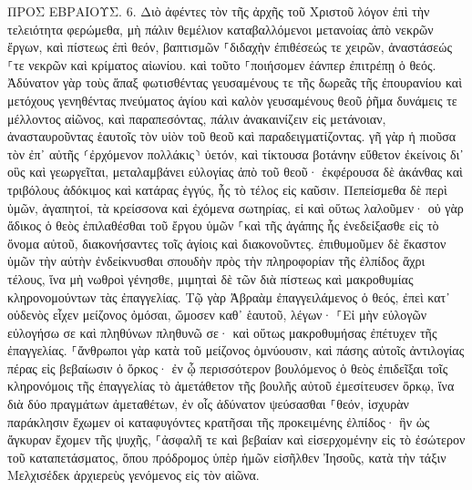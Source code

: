 \documentclass[twoside, 9pt]{extreport}
\begin{document}
ΠΡΟΣ ΕΒΡΑΙΟΥΣ.
6.
Διὸ ἀφέντες τὸν τῆς ἀρχῆς τοῦ Χριστοῦ λόγον ἐπὶ τὴν τελειότητα φερώμεθα, μὴ πάλιν θεμέλιον καταβαλλόμενοι μετανοίας ἀπὸ νεκρῶν ἔργων, καὶ πίστεως ἐπὶ θεόν, 
βαπτισμῶν ⸀διδαχὴν ἐπιθέσεώς τε χειρῶν, ἀναστάσεώς ⸀τε νεκρῶν καὶ κρίματος αἰωνίου. 
καὶ τοῦτο ⸀ποιήσομεν ἐάνπερ ἐπιτρέπῃ ὁ θεός. 
Ἀδύνατον γὰρ τοὺς ἅπαξ φωτισθέντας γευσαμένους τε τῆς δωρεᾶς τῆς ἐπουρανίου καὶ μετόχους γενηθέντας πνεύματος ἁγίου 
καὶ καλὸν γευσαμένους θεοῦ ῥῆμα δυνάμεις τε μέλλοντος αἰῶνος, 
καὶ παραπεσόντας, πάλιν ἀνακαινίζειν εἰς μετάνοιαν, ἀνασταυροῦντας ἑαυτοῖς τὸν υἱὸν τοῦ θεοῦ καὶ παραδειγματίζοντας. 
γῆ γὰρ ἡ πιοῦσα τὸν ἐπ᾽ αὐτῆς ⸂ἐρχόμενον πολλάκις⸃ ὑετόν, καὶ τίκτουσα βοτάνην εὔθετον ἐκείνοις δι᾽ οὓς καὶ γεωργεῖται, μεταλαμβάνει εὐλογίας ἀπὸ τοῦ θεοῦ· 
ἐκφέρουσα δὲ ἀκάνθας καὶ τριβόλους ἀδόκιμος καὶ κατάρας ἐγγύς, ἧς τὸ τέλος εἰς καῦσιν. 
Πεπείσμεθα δὲ περὶ ὑμῶν, ἀγαπητοί, τὰ κρείσσονα καὶ ἐχόμενα σωτηρίας, εἰ καὶ οὕτως λαλοῦμεν· 
οὐ γὰρ ἄδικος ὁ θεὸς ἐπιλαθέσθαι τοῦ ἔργου ὑμῶν ⸀καὶ τῆς ἀγάπης ἧς ἐνεδείξασθε εἰς τὸ ὄνομα αὐτοῦ, διακονήσαντες τοῖς ἁγίοις καὶ διακονοῦντες. 
ἐπιθυμοῦμεν δὲ ἕκαστον ὑμῶν τὴν αὐτὴν ἐνδείκνυσθαι σπουδὴν πρὸς τὴν πληροφορίαν τῆς ἐλπίδος ἄχρι τέλους, 
ἵνα μὴ νωθροὶ γένησθε, μιμηταὶ δὲ τῶν διὰ πίστεως καὶ μακροθυμίας κληρονομούντων τὰς ἐπαγγελίας. 
Τῷ γὰρ Ἀβραὰμ ἐπαγγειλάμενος ὁ θεός, ἐπεὶ κατ᾽ οὐδενὸς εἶχεν μείζονος ὀμόσαι, ὤμοσεν καθ᾽ ἑαυτοῦ, 
λέγων· ⸀Εἰ μὴν εὐλογῶν εὐλογήσω σε καὶ πληθύνων πληθυνῶ σε· 
καὶ οὕτως μακροθυμήσας ἐπέτυχεν τῆς ἐπαγγελίας. 
⸀ἄνθρωποι γὰρ κατὰ τοῦ μείζονος ὀμνύουσιν, καὶ πάσης αὐτοῖς ἀντιλογίας πέρας εἰς βεβαίωσιν ὁ ὅρκος· 
ἐν ᾧ περισσότερον βουλόμενος ὁ θεὸς ἐπιδεῖξαι τοῖς κληρονόμοις τῆς ἐπαγγελίας τὸ ἀμετάθετον τῆς βουλῆς αὐτοῦ ἐμεσίτευσεν ὅρκῳ, 
ἵνα διὰ δύο πραγμάτων ἀμεταθέτων, ἐν οἷς ἀδύνατον ψεύσασθαι ⸀θεόν, ἰσχυρὰν παράκλησιν ἔχωμεν οἱ καταφυγόντες κρατῆσαι τῆς προκειμένης ἐλπίδος· 
ἣν ὡς ἄγκυραν ἔχομεν τῆς ψυχῆς, ⸀ἀσφαλῆ τε καὶ βεβαίαν καὶ εἰσερχομένην εἰς τὸ ἐσώτερον τοῦ καταπετάσματος, 
ὅπου πρόδρομος ὑπὲρ ἡμῶν εἰσῆλθεν Ἰησοῦς, κατὰ τὴν τάξιν Μελχισέδεκ ἀρχιερεὺς γενόμενος εἰς τὸν αἰῶνα. 
\end{document}
